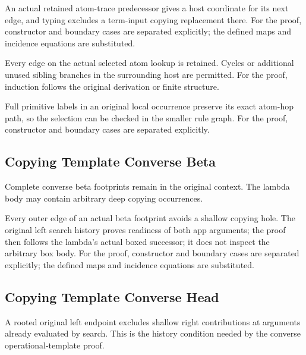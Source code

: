 An actual retained atom-trace predecessor gives a host coordinate for its next edge, and typing excludes a term-input copying replacement there.
For the proof, constructor and boundary cases are separated explicitly; the defined maps and incidence equations are substituted.
\par{}

Every edge on the actual selected atom lookup is retained. Cycles or additional unused sibling branches in the surrounding host are permitted.
For the proof, induction follows the original derivation or finite structure.
\par{}

Full primitive labels in an original local occurrence preserve its exact atom-hop path, so the selection can be checked in the smaller rule graph.
For the proof, constructor and boundary cases are separated explicitly.
\par{}

\subsection{Copying Template Converse Beta}
Complete converse beta footprints remain in the original context. The lambda body may contain arbitrary deep copying occurrences.

Every outer edge of an actual beta footprint avoids a shallow copying hole. The original left search history proves readiness of both app arguments; the proof then follows the lambda's actual boxed successor; it does not inspect the arbitrary box body.
For the proof, constructor and boundary cases are separated explicitly; the defined maps and incidence equations are substituted.
\par{}

\subsection{Copying Template Converse Head}
A rooted original left endpoint excludes shallow right contributions at arguments already evaluated by search. This is the history condition needed by the converse operational-template proof.

